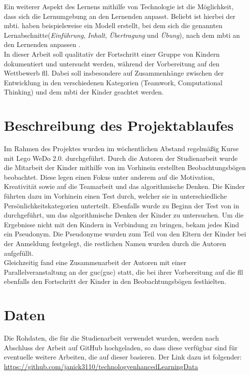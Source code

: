 Ein weiterer Aspekt des Lernens mithilfe von Technologie ist die Möglichkeit, dass sich die Lernumgebung an den Lernenden anpasst. Beliebt ist hierbei der \acrlong{mbti}. \citeauthor{yel_adaptive_2018} haben beispielsweise ein Modell erstellt, bei dem sich die genannten Lernabschnitte(\textit{Einführung}, \textit{Inhalt}, \textit{Übertragung} und \textit{Übung}), nach dem \acrshort{mbti} an den Lernenden anpassen \cite{yel_adaptive_2018}.\\
In dieser Arbeit soll qualitativ der Fortschritt einer Gruppe von Kindern dokumentiert und untersucht werden, während der Vorbereitung auf den Wettbewerb \acrlong{fll}. Dabei soll insbesondere auf Zusammenhänge zwischen der Entwicklung in den verschiedenen Kategorien (Teamwork, Computational Thinking) und dem \acrshort{mbti} der Kinder geachtet werden.



\section{Beschreibung des Projektablaufes}
Im Rahmen des Projektes wurden im wöchentlichen Abstand regelmäßig Kurse mit Lego WeDo 2.0. durchgeführt. Durch die Autoren der Studienarbeit wurde die Mitarbeit der Kinder mithilfe von im Vorhinein erstellten Beobachtungsbögen beobachtet. Diese legen einen Fokus unter anderem auf die Motivation, Kreativität sowie auf die Teamarbeit und das algorithmische Denken. Die Kinder führten dazu im Vorhinein einen Test durch, welcher sie in unterschiedliche Persönlichkeitskategorien unterteilt. Ebenfalls wurde zu Beginn der Test von \citeauthor{zapata_bctt_2021} in  durchgeführt, um das algorithmische Denken der Kinder zu untersuchen.
Um die Ergebnisse nicht mit den Kindern in Verbindung zu bringen, bekam jedes Kind ein Pseudonym. Die Pseudonyme wurden zum Teil von den Eltern der Kinder bei der Anmeldung festgelegt, die restlichen Namen wurden durch die Autoren aufgefüllt.\\
Gleichzeitig fand eine Zusammenarbeit der Autoren mit einer Parallelveranstaltung an der \acrlong{guc}(\acrshort{guc}) statt, die bei ihrer Vorbereitung auf die \acrshort{fll} ebenfalls den Fortschritt der Kinder in den Beobachtungsbögen festhielten.


\section{Daten}
Die Rohdaten, die für die Studienarbeit verwendet wurden, werden nach Abschluss der Arbeit auf GitHub hochgeladen, so dass diese verfügbar sind für eventuelle weitere Arbeiten, die auf dieser basieren. Der Link dazu ist folgender: \url{https://github.com/janick3110/technologyenhancedLearningData}